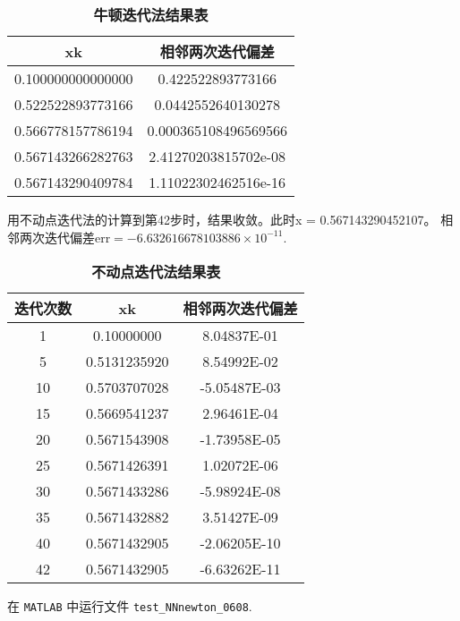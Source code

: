 \documentclass[12pt, a4paper, oneside]{ctexart}
\begin{document}
\begin{table}[h]
	\centering
	\caption{\textbf{牛顿迭代法结果表}}
	\begin{tabular}{|c|c|}
		\hline
		xk                & 相邻两次迭代偏差             \\ \hline
		0.100000000000000 & 0.422522893773166    \\
		0.522522893773166 & 0.0442552640130278   \\
		0.566778157786194 & 0.000365108496569566 \\
		0.567143266282763 & 2.41270203815702e-08 \\
		0.567143290409784 & 1.11022302462516e-16 \\ \hline
	\end{tabular}
\end{table}

\vspace{1em} %

\raggedright
用不动点迭代法的计算到第42步时，结果收敛。此时x = 0.567143290452107。 相邻两次迭代偏差$\text{err} =-6.632616678103886 \times 10^{-11}$.

\begin{table}[h]
	\centering
	\caption{\textbf{不动点迭代法结果表}}
	\begin{tabular}{|c|c|c|}
		\hline
		迭代次数 & xk           & 相邻两次迭代偏差     \\ \hline
		1    & 0.10000000   & 8.04837E-01  \\
		5    & 0.5131235920 & 8.54992E-02  \\
		10   & 0.5703707028 & -5.05487E-03 \\
		15   & 0.5669541237 & 2.96461E-04  \\
		20   & 0.5671543908 & -1.73958E-05 \\
		25   & 0.5671426391 & 1.02072E-06  \\
		30   & 0.5671433286 & -5.98924E-08 \\
		35   & 0.5671432882 & 3.51427E-09  \\
		40   & 0.5671432905 & -2.06205E-10 \\
		42   & 0.5671432905 & -6.63262E-11 \\ \hline
	\end{tabular}
\end{table}

\vspace{1em}
\vspace{1em}
在 \texttt{MATLAB} 中运行文件 \texttt{test\_NNnewton\_0608}.
\end{document}
